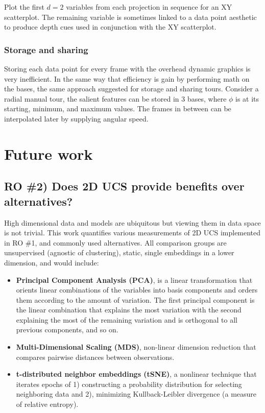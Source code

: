 \documentclass{monashthesis}
\begin{document}
Plot the first \(d=2\) variables from each projection in sequence for an
XY scatterplot. The remaining variable is sometimes linked to a data
point aesthetic to produce depth cues used in conjunction with the XY
scatterplot.

\subsection{Storage and sharing}\label{storage-and-sharing}

Storing each data point for every frame with the overhead dynamic
graphics is very inefficient. In the same way that efficiency is gain by
performing math on the bases, the same approach suggested for storage
and sharing tours. Consider a radial manual tour, the salient features
can be stored in 3 bases, where \(\phi\) is at its starting, minimum,
and maximum values. The frames in between can be interpolated later by
supplying angular speed.

\chapter{Future work}\label{ch:future_work}

\section{RO \#2) Does 2D UCS provide benefits over
alternatives?}\label{ro-2-does-2d-ucs-provide-benefits-over-alternatives}

High dimensional data and models are ubiquitous but viewing them in data
space is not trivial. This work quantifies various measurements of 2D
UCS implemented in RO \#1, and commonly used alternatives. All
comparison groups are unsupervised (agnostic of clustering), static,
single embeddings in a lower dimension, and would include:

\begin{itemize}
\tightlist
\item
  \textbf{Principal Component Analysis (PCA)}, is a linear
  transformation that orients linear combinations of the variables into
  basis components and orders them according to the amount of variation.
  The first principal component is the linear combination that explains
  the most variation with the second explaining the most of the
  remaining variation and is orthogonal to all previous components, and
  so on.
\item
  \textbf{Multi-Dimensional Scaling (MDS)}, non-linear dimension
  reduction that compares pairwise distances between observations.
\item
  \textbf{t-distributed neighbor embeddings (tSNE)}, a nonlinear
  technique that iterates epochs of 1) constructing a probability
  distribution for selecting neighboring data and 2), minimizing
  Kullback-Leibler divergence (a measure of relative entropy).
\end{itemize}
\end{document}
